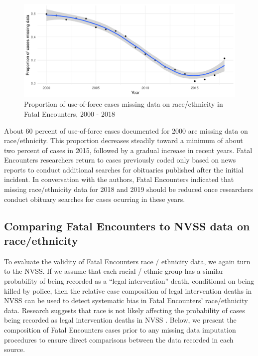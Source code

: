 \documentclass{article}
\begin{document}
\begin{figure}
	\centering
	\includegraphics[width=\linewidth]{vis/prop_missing_race.pdf}
	\caption{Proportion of use-of-force cases missing data on race/ethnicity in Fatal Encounters, 2000 - 2018}
	\label{fig:missing_race_ts}
\end{figure}

About 60 percent of use-of-force cases documented for 2000 are missing data on race/ethnicity. This proportion decreases steadily toward a minimum of about two percent of cases in 2015, followed by a gradual increase in recent years. Fatal Encounters researchers return to cases previously coded only based on news reports to conduct additional searches for obituaries published after the initial incident. In conversation with the authors, Fatal Encounters indicated that missing race/ethnicity data for 2018 and 2019 should be reduced once researchers conduct obituary searches for cases ocurring in these years.

\subsection*{Comparing Fatal Encounters to NVSS data on race/ethnicity}

To evaluate the validity of Fatal Encounters race / ethnicity data, we again turn to the NVSS. If we assume that each racial / ethnic group has a similar probability of being recorded as a ``legal intervention'' death, conditional on being killed by police, then the relative case composition of legal intervention deaths in NVSS can be used to detect systematic bias in Fatal Encounters' race/ethnicity data. Research suggests that race is not likely affecting the probability of cases being recorded as legal intervention deaths in NVSS \cite{Feldman2017Quantifying}. Below, we present the composition of Fatal Encounters cases prior to any missing data imputation procedures to ensure direct comparisons between the data recorded in each source. 
\end{document}
